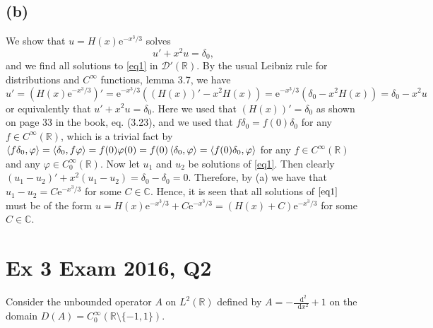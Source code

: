 \documentclass[a4paper,11pt]{article}
\newcommand{\euler}[1]{\text{e}^{#1}}
\newcommand*\diff{\mathop{}\!\mathrm{d}}
\newcommand{\R}{\mathbb{R}}
\newcommand{\C}{\mathbb{C}}
\numberwithin{equation}{section}
\begin{document}
\subsection*{(b)}
We show that $ u=H(x)\euler{-x^3/3} $ solves \begin{equation} \label{eq1}
u'+x^2u=\delta_0,
\end{equation}
and we find all solutions to \eqref{eq1} in $ \mathcal{D}'(\R) $.
By the usual Leibniz rule for distributions and $ C^\infty $ functions, lemma 3.7, we have \begin{equation}
u'=(H(x)\euler{-x^3/3})'=\euler{-x^3/3}((H(x))'-x^2 H(x))=\euler{-x^3/3}(\delta_0-x^2H(x))=\delta_0-x^2 u
\end{equation}
or equivalently that $ u'+x^2u=\delta_0 $. Here we used that $ (H(x))'=\delta_0 $ as shown on page 33 in the book, eq. (3.23), and we used that $ f\delta_0=f(0)\delta_0 $ for any $ f\in C^{\infty}(\R) $, which is a trivial fact by $ \braket{f\delta_0,\varphi}=\braket{\delta_0,f\varphi}=f(0)\varphi(0)=f(0)\braket{\delta_0,\varphi}=\braket{f(0)\delta_0,\varphi} $ for any $ f\in C^\infty(\R) $ and any $ \varphi\in C^{\infty}_0(\R) $.
Now let $ u_1 $ and $ u_2 $ be solutions of \eqref{eq1}. Then clearly $ (u_1-u_2)'+x^2(u_1-u_2)=\delta_0-\delta_0=0 $. Therefore, by (a) we have that $ u_1-u_2=C\euler{-x^3/3} $ for some $ C\in \C $. Hence, it is seen that all solutions of $ \eqref{eq1} $ must be of the form $ u=H(x)\euler{-x^3/3}+C\euler{-x^3/3}=(H(x)+C)\euler{-x^3/3} $ for some $ C\in \C $.



\section*{Ex 3 Exam 2016, Q2}
\setcounter{section}{3}
Consider the unbounded operator $ A $ on $ L^2(\R) $ defined by $ A=-\frac{\diff^2}{\diff x^2}+1 $ on the domain $ D(A)=C^\infty_0(\R\setminus\{-1,1\}) $.
\end{document}
